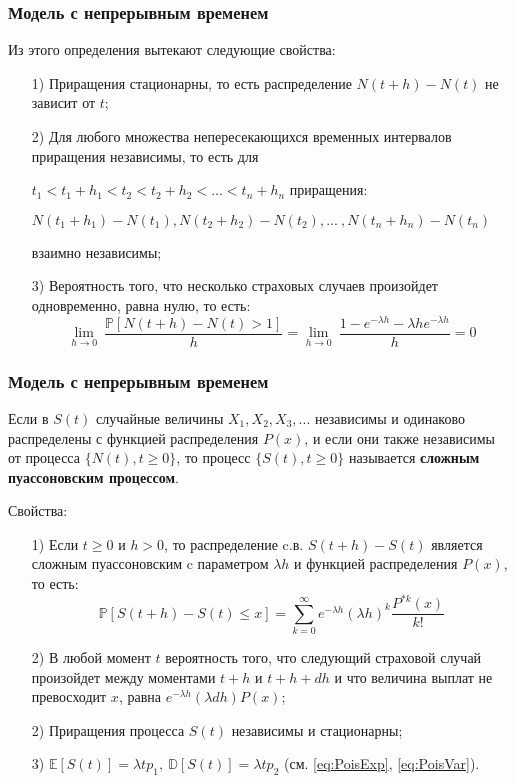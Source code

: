 \documentclass[10pt]{beamer}
\numberwithin{equation}{section}
\begin{document}
\begin{frame}
\frametitle{Модель с непрерывным временем}
\noindent
Из этого определения вытекают следующие свойства:
\begin{enumerate}
    \item[1)] Приращения стационарны, то есть распределение $N(t+h)-N(t)$ не зависит от $t$;
    \item[2)] Для любого множества непересекающихся временных интервалов приращения независимы,
    то есть для
    \par\smallskip
    $t_{1}<t_{1}+h_{1}<t_{2}<t_{2}+h_{2}<...<t_{n}+h_{n}$
    приращения:
    \par\smallskip
    $N(t_{1}+h_{1})-N(t_{1}), N(t_{2}+h_{2})-N(t_{2}),...\:,N(t_{n}+h_{n})-N(t_{n})$
    \par\smallskip
    взаимно независимы;
    \item[3)] Вероятность того, что несколько страховых случаев произойдет одновременно, равна нулю,
    то есть:
    \begin{equation*}
        \lim_{h \rightarrow 0} \: \frac{\mathbb{P}[N(t+h)-N(t)>1]}{h} =
        \lim_{h \rightarrow 0} \: \frac{1-e^{- \lambda h}- \lambda he^{- \lambda h}}{h} = 0
    \end{equation*}
\end{enumerate}
\end{frame}


\begin{frame}
\frametitle{Модель с непрерывным временем}
\noindent
Если в $S(t)$ случайные величины $X_{1}, X_{2}, X_{3}, ...$ независимы и одинаково распределены
с функцией распределения $P(x)$, и если они также независимы от процесса
$\big\{N(t), t\geq 0\big\}$, то процесс $\big\{S(t), t\geq 0\big\}$ называется
\textbf{сложным пуассоновским процессом}.
\begin{block} {Свойства:}
\begin{enumerate}
    \item[1)] Если $t\geq 0 $ и $h > 0$, то распределение c.в. $S(t + h) - S(t)$
    является сложным пуассоновским c параметром $\lambda h$ и функцией распределения $P(x)$, то есть:
    \begin{equation*}
        \mathbb{P}[S(t+h)-S(t)\leq x] = 
        \sum_{k=0}^{ \infty }e^{- \lambda h}(\lambda h)^{k} \frac{P^{\ast k}(x) }{k!}
    \end{equation*}
    \item[2)] В любой момент $t$ вероятность того, что следующий страховой случай произойдет
    между моментами $t + h$ и $t + h + dh$ и что величина выплат не превосходит $x$, равна
    $e^{-\lambda h}(\lambda dh)P(x)$;
    \item[2)] Приращения процесса $S(t)$ независимы и стационарны;
    \item[3)] $\mathbb{E}[S(t)] = \lambda t p_1,\ \mathbb{D}[S(t)] = \lambda t p_2$ (см. \ref{eq:PoisExp},
    \ref{eq:PoisVar}).
\end{enumerate}
\end{block}
\end{frame}
\end{document}
